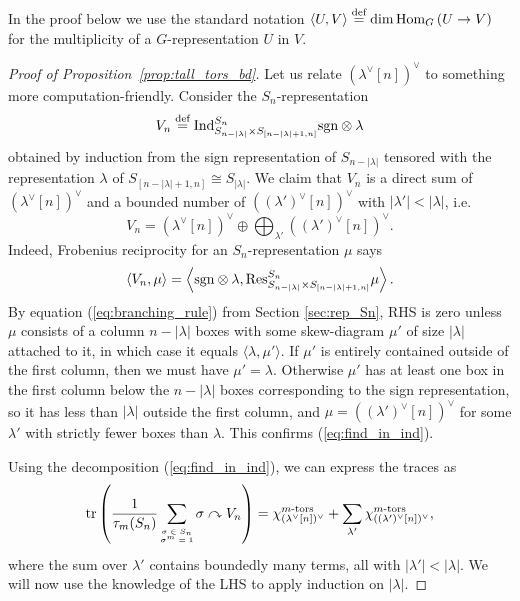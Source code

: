 \documentclass{amsart}
\newcommand{\defeq}{\stackrel{\tn{def}}{=}}
\newcommand{\Hom}[3][]{\tn{Hom}_{#1}\left(#2\to #3\right)}
\newcommand{\tn}{\textnormal}
\newcommand{\tr}{\operatorname{tr}}
\begin{document}
In the proof below we use the standard notation $\langle U,V\rangle\defeq\dim\Hom[G]{U}{V}$ for the multiplicity of a $G$-representation $U$ in $V$.
\begin{proof}[Proof of Proposition~\ref{prop:tall_tors_bd}]
Let us relate $(\lambda^\vee[n])^\vee$ to something more computation-friendly. Consider the $S_n$-representation
\begin{equation*}
V_n\defeq\tn{Ind}^{S_n}_{S_{n-|\lambda|}\times S_{[n-|\lambda|+1,n]}}\tn{sgn}\otimes\lambda
\end{equation*}
obtained by induction from the sign representation of $S_{n-|\lambda|}$ tensored with the representation $\lambda$ of $S_{[n-|\lambda|+1,n]}\cong S_{|\lambda|}$. We claim that $V_n$ is a direct sum of $(\lambda^\vee[n])^\vee$ and a bounded number of $((\lambda')^\vee[n])^\vee$ with $|\lambda'|<|\lambda|$, i.e.
\begin{equation}\label{eq:find_in_ind}
V_n=(\lambda^\vee[n])^\vee\oplus\bigoplus_{\lambda'}((\lambda')^\vee[n])^\vee.
\end{equation}
Indeed, Frobenius reciprocity for an $S_n$-representation $\mu$ says
\begin{equation}\label{eq:Frob_reciprocity}
\left\langle V_n,\mu\right\rangle=\left\langle\tn{sgn}\otimes\lambda,\tn{Res}^{S_n}_{S_{n-|\lambda|}\times S_{[n-|\lambda|+1,n]}}\mu\right\rangle.
\end{equation}
By equation (\ref{eq:branching_rule}) from Section \ref{sec:rep_Sn}, RHS is zero unless $\mu$ consists of a column $n-|\lambda|$ boxes with some skew-diagram $\mu'$ of size $|\lambda|$ attached to it, in which case it equals $\langle\lambda,\mu'\rangle$. If $\mu'$ is entirely contained outside of the first column, then we must have $\mu'=\lambda$. Otherwise $\mu'$ has at least one box in the first column below the $n-|\lambda|$ boxes corresponding to the sign representation, so it has less than $|\lambda|$ outside the first column, and $\mu=((\lambda')^\vee[n])^\vee$ for some $\lambda'$ with strictly fewer boxes than $\lambda$. This confirms (\ref{eq:find_in_ind}).

Using the decomposition (\ref{eq:find_in_ind}), we can express the traces as
\begin{equation}\label{eq:tr_ind_sum_smaller}
\tr\left(\frac{1}{\tau_m(S_n)}\sum_{\tiny\begin{matrix}\sigma\in S_n\\\sigma^m=1\end{matrix}}\sigma\curvearrowright V_n\right)=\chi_{(\lambda^\vee[n])^\vee}^{m\tn{-tors}}+\sum_{\lambda'}\chi_{((\lambda')^\vee[n])^\vee}^{m\tn{-tors}},
\end{equation}
where the sum over $\lambda'$ contains boundedly many terms, all with $|\lambda'|<|\lambda|$. We will now use the knowledge of the LHS to apply induction on $|\lambda|$.


\end{proof}
\end{document}
